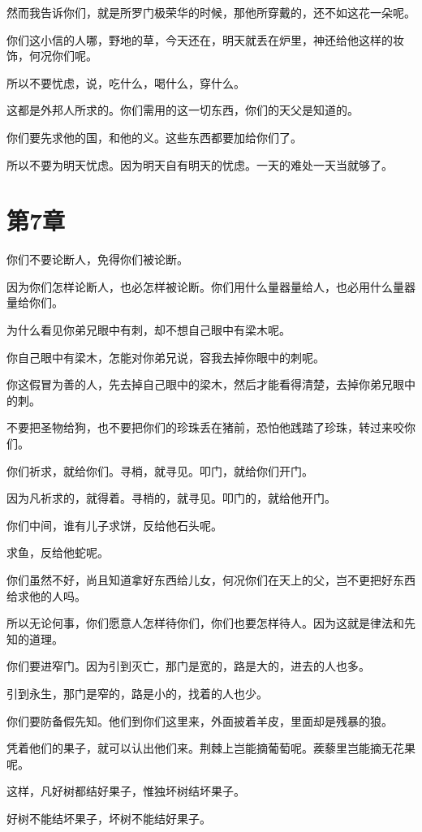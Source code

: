 \documentclass[12pt,oneside]{book}
\begin{document}
然而我告诉你们，就是所罗门极荣华的时候，那他所穿戴的，还不如这花一朵呢。

你们这小信的人哪，野地的草，今天还在，明天就丢在炉里，神还给他这样的妆饰，何况你们呢。

所以不要忧虑，说，吃什么，喝什么，穿什么。

这都是外邦人所求的。你们需用的这一切东西，你们的天父是知道的。

你们要先求他的国，和他的义。这些东西都要加给你们了。

所以不要为明天忧虑。因为明天自有明天的忧虑。一天的难处一天当就够了。

\chapter{第7章}
你们不要论断人，免得你们被论断。

因为你们怎样论断人，也必怎样被论断。你们用什么量器量给人，也必用什么量器量给你们。

为什么看见你弟兄眼中有刺，却不想自己眼中有梁木呢。

你自己眼中有梁木，怎能对你弟兄说，容我去掉你眼中的刺呢。

你这假冒为善的人，先去掉自己眼中的梁木，然后才能看得清楚，去掉你弟兄眼中的刺。

不要把圣物给狗，也不要把你们的珍珠丢在猪前，恐怕他践踏了珍珠，转过来咬你们。

你们祈求，就给你们。寻梢，就寻见。叩门，就给你们开门。

因为凡祈求的，就得着。寻梢的，就寻见。叩门的，就给他开门。

你们中间，谁有儿子求饼，反给他石头呢。

求鱼，反给他蛇呢。

你们虽然不好，尚且知道拿好东西给儿女，何况你们在天上的父，岂不更把好东西给求他的人吗。

所以无论何事，你们愿意人怎样待你们，你们也要怎样待人。因为这就是律法和先知的道理。

你们要进窄门。因为引到灭亡，那门是宽的，路是大的，进去的人也多。

引到永生，那门是窄的，路是小的，找着的人也少。

你们要防备假先知。他们到你们这里来，外面披着羊皮，里面却是残暴的狼。

凭着他们的果子，就可以认出他们来。荆棘上岂能摘葡萄呢。蒺藜里岂能摘无花果呢。

这样，凡好树都结好果子，惟独坏树结坏果子。

好树不能结坏果子，坏树不能结好果子。
\end{document}
